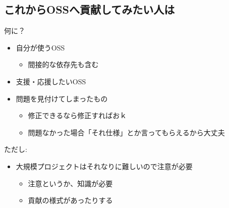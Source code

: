 \documentclass[
        unicode%
    ]{beamer}
\begin{document}
\subsection{これからOSSへ貢献してみたい人は}

\begin{frame}{何に？}
    \begin{itemize}
        \pause
        \item 自分が使うOSS
            \begin{itemize}
                \item 間接的な依存先も含む
            \end{itemize}
        \pause
        \item 支援・応援したいOSS
        \pause
        \item 問題を見付けてしまったもの
            \begin{itemize}
                \item 修正できるなら修正すればおｋ
                \item 問題なかった場合「それ仕様」とか言ってもらえるから大丈夫
            \end{itemize}
    \end{itemize}

    \pause
    ただし:

    \begin{itemize}
        \item 大規模プロジェクトはそれなりに難しいので注意が必要
            \begin{itemize}
                \item 注意というか、知識が必要
                \item 貢献の様式があったりする
            \end{itemize}
    \end{itemize}
\end{frame}
\end{document}
